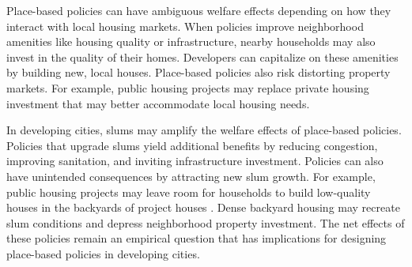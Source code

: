 \documentclass[12pt]{article}
\begin{document}
Place-based policies can have ambiguous welfare effects depending on how they interact with local housing markets.  When policies improve neighborhood amenities like housing quality or infrastructure, nearby households may also invest in the quality of their homes.  Developers can capitalize on these amenities by building new, local houses.  Place-based policies also risk distorting property markets.  For example, public housing projects may replace private housing investment that may better accommodate local housing needs.  

In developing cities, slums may amplify the welfare effects of place-based policies.  Policies that upgrade slums yield additional benefits by reducing congestion, improving sanitation, and inviting infrastructure investment.  Policies can also have unintended consequences by attracting new slum growth.  For example, public housing projects may leave room for households to build low-quality houses in the backyards of project houses \citep{Brueckner2018backyarding}.  Dense backyard housing may recreate slum conditions and depress neighborhood property investment.  The net effects of these policies remain an empirical question that has implications for designing place-based policies in developing cities.













\end{document}

